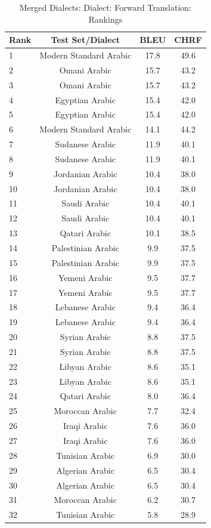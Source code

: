 \begin{table}[htbp]
\centering
\caption{Merged Dialects: Dialect: Forward Translation: Rankings}
\label{tab:testset_ranking_forward_merged_dialect}
\begin{tabular}{l@{\hspace{3pt}}c@{\hspace{3pt}}c@{\hspace{3pt}}c}
\toprule
Rank & Test Set/Dialect & BLEU & CHRF \\
\midrule
1 & Modern Standard Arabic  & 17.8 & 49.6 \\
2 & Omani Arabic & 15.7 & 43.2 \\
3 & Omani Arabic  & 15.7 & 43.2 \\
4 & Egyptian Arabic & 15.4 & 42.0 \\
5 & Egyptian Arabic  & 15.4 & 42.0 \\
6 & Modern Standard Arabic & 14.1 & 44.2 \\
7 & Sudanese Arabic & 11.9 & 40.1 \\
8 & Sudanese Arabic  & 11.9 & 40.1 \\
9 & Jordanian Arabic & 10.4 & 38.0 \\
10 & Jordanian Arabic  & 10.4 & 38.0 \\
11 & Saudi Arabic & 10.4 & 40.1 \\
12 & Saudi Arabic  & 10.4 & 40.1 \\
13 & Qatari Arabic  & 10.1 & 38.5 \\
14 & Palestinian Arabic & 9.9 & 37.5 \\
15 & Palestinian Arabic  & 9.9 & 37.5 \\
16 & Yemeni Arabic & 9.5 & 37.7 \\
17 & Yemeni Arabic  & 9.5 & 37.7 \\
18 & Lebanese Arabic & 9.4 & 36.4 \\
19 & Lebanese Arabic  & 9.4 & 36.4 \\
20 & Syrian Arabic & 8.8 & 37.5 \\
21 & Syrian Arabic  & 8.8 & 37.5 \\
22 & Libyan Arabic & 8.6 & 35.1 \\
23 & Libyan Arabic  & 8.6 & 35.1 \\
24 & Qatari Arabic & 8.0 & 36.4 \\
25 & Moroccan Arabic  & 7.7 & 32.4 \\
26 & Iraqi Arabic & 7.6 & 36.0 \\
27 & Iraqi Arabic  & 7.6 & 36.0 \\
28 & Tunisian Arabic  & 6.9 & 30.0 \\
29 & Algerian Arabic & 6.5 & 30.4 \\
30 & Algerian Arabic  & 6.5 & 30.4 \\
31 & Moroccan Arabic & 6.2 & 30.7 \\
32 & Tunisian Arabic & 5.8 & 28.9 \\
\bottomrule
\end{tabular}
\end{table}
